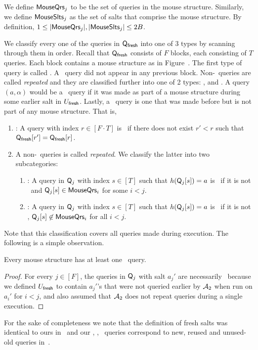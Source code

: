   
We define $\mathsf{MouseQrs}_j$ to be the set of queries in the mouse structure. Similarly, we define  $\mathsf{MouseSlts}_j$ as the set of salts that comprise the mouse structure. By definition, $1\leq |\mathsf{MouseQrs}_j|, |\mathsf{MouseSlts}_j|\leq 2B$. 

 We classify every one of the queries in $\mathsf{Q}_\textsf{fresh}$ into one of 3 types by scanning through them in order. Recall that $\mathsf{Q}_\textsf{fresh}$ consists of $F$ blocks, each consisting of $T$ queries. Each block contains a mouse structure as in Figure~.
The first type of query is called \new. A \new\ query did not appear in any previous block. Non-\new\ queries are called \emph{repeated} and they are classified further into one of 2 types: \frep, and \urep. A query $(a,\alpha)$ would be a \frep\ query if it was made as part of a mouse structure during some earlier salt in $U_\textsf{fresh}$. Lastly, a \urep\ query is one that was made before but is not part of any mouse structure. That is,
\begin{enumerate}
\item \new: A query with index $r\in [F\cdot T]$ is \new\ if there does not exist $r'<r$ such that $\mathsf{Q}_\textsf{fresh}[r']=\mathsf{Q}_\textsf{fresh}[r]$. 
\item A non-\new\ queries is called \emph{repeated}. We classify the latter into two subcategories:
\begin{enumerate}
\item \frep: 
A query in $\mathsf{Q}_j$ with index $s\in [T]$ such that $h(\mathsf{Q}_j[s])=a$ is \frep\ if it is not \new\ and $\mathsf{Q}_j[s]\in \mathsf{MouseQrs}_i$ for some $i<j$.
\item \urep: A query in $\mathsf{Q}_j$ with index $s\in [T]$ such that $h(\mathsf{Q}_j[s])=a$ is  \urep\  if it is not \new, $\mathsf{Q}_j[s]\not\in \mathsf{MouseQrs}_i$ for all $i<j$.
\end{enumerate}
\end{enumerate}
Note that this classification covers all queries made during execution. The following is a simple observation.
\begin{myclaim}\label{claim:onenew}
Every mouse structure has at least one \new\ query.
\end{myclaim}
\begin{proof}
For every $j\in [F]$, the queries in $\mathsf{Q}_j$ with salt $a_j'$ are necessarily \new\ because we defined $U_\textsf{fresh}$ to contain $a_j'$'s that were not queried earlier by $\mathcal{A}_2$ when run on $a_i'$ for $i<j$, and also assumed that $\mathcal{A}_2$ does not repeat queries during a single execution.
\end{proof}
For the sake of completeness we note that the definition of fresh salts was identical to ours in~\cite{AkshimaCDW20} and our \new, \frep, \urep\ queries correspond to new, reused and unused-old queries in~\cite{AkshimaCDW20}.

